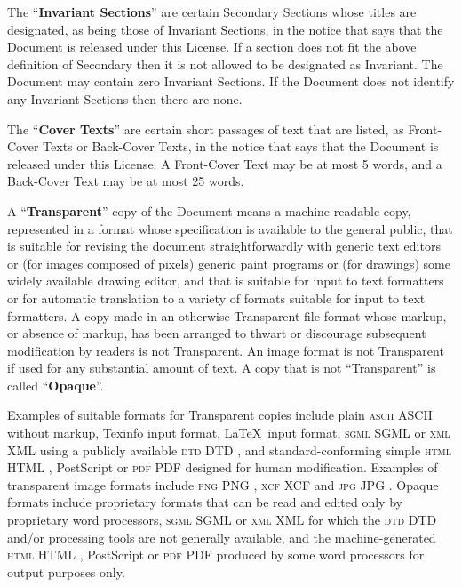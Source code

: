 The \enquote{\textbf{Invariant Sections}} are certain
Secondary Sections whose titles are designated, as being
those of Invariant Sections, in the notice that says that
the Document is released under this License. If a section
does not fit the above definition of Secondary then it is
not allowed to be designated as Invariant. The Document may
contain zero Invariant Sections. If the Document does not
identify any Invariant Sections then there are none.

The \enquote{\textbf{Cover Texts}} are certain short
passages of text that are listed, as Front-Cover Texts or
Back-Cover Texts, in the notice that says that the Document
is released under this License. A Front-Cover Text may be at
most 5 words, and a Back-Cover Text may be at most 25
words.

A \enquote{\textbf{Transparent}} copy of the Document means
a machine-readable copy, represented in a format whose
specification is available to the general public, that is
suitable for revising the document straightforwardly with
generic text editors or (for images composed of pixels)
generic paint programs or (for drawings) some widely
available drawing editor, and that is suitable for input to
text formatters or for automatic translation to a variety of
formats suitable for input to text formatters. A copy made
in an otherwise Transparent file format whose markup, or
absence of markup, has been arranged to thwart or discourage
subsequent modification by readers is not Transparent. An
image format is not Transparent if used for any substantial
amount of text. A copy that is not \enquote{Transparent} is
called \enquote{\textbf{Opaque}}.

Examples of suitable formats for Transparent copies include
plain
\ifgfdl@sc
  \textsc{ascii}
\else
  ASCII
\fi
without markup, Texinfo input format, \LaTeX\
input format,
\ifgfdl@sc
  \textsc{sgml}
\else
  SGML
\fi
or
\ifgfdl@sc
  \textsc{xml}
\else
  XML
\fi
using a publicly available
\ifgfdl@sc
  \textsc{dtd}%
\else
  DTD%
\fi
, and standard-conforming simple
\ifgfdl@sc
  \textsc{html}%
\else
  HTML%
\fi
, Post\-Script or
\ifgfdl@sc
  \textsc{pdf}
\else
  PDF
\fi
designed for human modification. Examples of transparent
image formats include
\ifgfdl@sc
  \textsc{png}%
\else
  PNG%
\fi
,
\ifgfdl@sc
  \textsc{xcf}
\else
  XCF
\fi
and
\ifgfdl@sc
  \textsc{jpg}%
\else
  JPG%
\fi
. Opaque formats include proprietary formats that can be
read and edited only by proprietary word processors,
\ifgfdl@sc
  \textsc{sgml}
\else
  SGML
\fi
or
\ifgfdl@sc
  \textsc{xml}
\else
  XML
\fi
for which the
\ifgfdl@sc
  \textsc{dtd}
\else
  DTD
\fi
and/or processing tools are not generally available, and
the machine-generated
\ifgfdl@sc
  \textsc{html}%
\else
  HTML%
\fi
, PostScript or
\ifgfdl@sc
  \textsc{pdf}
\else
  PDF
\fi
produced by some word processors for output purposes only.

